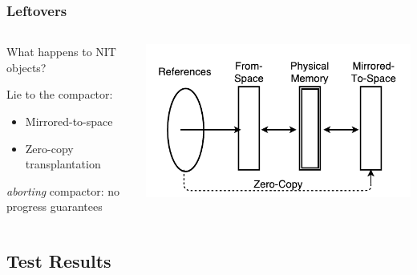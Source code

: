 \documentclass{beamer}
\newcommand{\linespace}{\vskip 0.25cm}
\begin{document}
\begin{frame}

\frametitle{Leftovers}

\begin{columns}
\begin{column}{0.5\textwidth}
What happens to NIT objects?

\linespace
\linespace

Lie to the compactor:
\begin{itemize}
\item Mirrored-to-space
\item Zero-copy transplantation
\end{itemize}

\linespace
\linespace

\emph{aborting} compactor: no progress guarantees
\end{column}
\begin{column}{0.5\textwidth}

\includegraphics[width=.95\textwidth]{Illustrations/collie_mirrored_rough.pdf}

\end{column}
\end{columns}

\end{frame}



\subsection*{Test Results}
\end{document}
